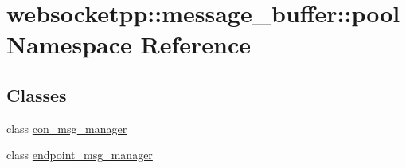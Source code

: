 \hypertarget{namespacewebsocketpp_1_1message__buffer_1_1pool}{}\section{websocketpp\+:\+:message\+\_\+buffer\+:\+:pool Namespace Reference}
\label{namespacewebsocketpp_1_1message__buffer_1_1pool}
\subsection*{Classes}
\begin{DoxyCompactItemize}
\item 
class \hyperlink{classwebsocketpp_1_1message__buffer_1_1pool_1_1con__msg__manager}{con\+\_\+msg\+\_\+manager}
\item 
class \hyperlink{classwebsocketpp_1_1message__buffer_1_1pool_1_1endpoint__msg__manager}{endpoint\+\_\+msg\+\_\+manager}
\end{DoxyCompactItemize}
